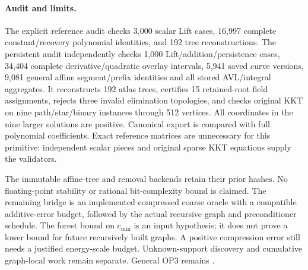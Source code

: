 \paragraph{Audit and limits.}
The explicit reference audit checks 3,000 scalar Lift cases, 16,997 complete
constant/recovery polynomial identities, and 192 tree reconstructions.
The persistent audit independently checks 1,000 Lift/addition/persistence
cases, 34,404 complete derivative/quadratic overlay intervals, 5,941 saved
curve versions, 9,081 general affine segment/prefix identities and all
stored AVL/integral aggregates. It reconstructs 192 atlas trees, certifies
15 retained-root field assignments, rejects three invalid elimination
topologies, and checks original KKT on nine path/star/binary instances
through 512 vertices. All coordinates in the nine larger solutions are
positive. Canonical export is compared with full polynomial coefficients.
Exact reference matrices are unnecessary for this primitive: independent
scalar pieces and original sparse KKT equations supply the validators.

The immutable affine-tree and removal backends retain their prior hashes.
No floating-point stability or rational bit-complexity bound is claimed.
The remaining bridge is an implemented compressed coarse oracle with a
compatible additive-error budget, followed by the actual recursive graph
and preconditioner schedule. The forest bound on $c_{\min}$ is an input
hypothesis; it does not prove a lower bound for future recursively built
graphs. A positive compression error still needs a justified energy-scale
budget. Unknown-support discovery and cumulative graph-local work remain
separate. General OP3 remains \statusopen{}.
